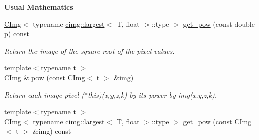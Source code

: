 \begin{Indent}{\bf Usual Mathematics}
\begin{DoxyCompactItemize}
\hyperlink{structcimg__library_1_1_c_img}{CImg}$<$ typename \hyperlink{structcimg__library_1_1cimg_1_1largest}{cimg::largest}$<$ T, float $>$::type $>$ \hyperlink{structcimg__library_1_1_c_img_a1d4a1eb3b00043c5bc66705289346426}{get\_\-pow} (const double p) const 
\begin{DoxyCompactList}\small\item\em Return the image of the square root of the pixel values. \item\end{DoxyCompactList}\item 
{\footnotesize template$<$typename t $>$ }\\\hyperlink{structcimg__library_1_1_c_img}{CImg} \& \hyperlink{structcimg__library_1_1_c_img_adc6088bce27175f0d1ba297a00e73350}{pow} (const \hyperlink{structcimg__library_1_1_c_img}{CImg}$<$ t $>$ \&img)
\begin{DoxyCompactList}\small\item\em Return each image pixel ($\ast$this)(x,y,z,k) by its power by {\ttfamily img(x,y,z,k)}. \item\end{DoxyCompactList}\item 
\hypertarget{structcimg__library_1_1_c_img_a705047141ea672c47de36bfe6c767f55}{
{\footnotesize template$<$typename t $>$ }\\\hyperlink{structcimg__library_1_1_c_img}{CImg}$<$ typename \hyperlink{structcimg__library_1_1cimg_1_1largest}{cimg::largest}$<$ T, float $>$::type $>$ \hyperlink{structcimg__library_1_1_c_img_a705047141ea672c47de36bfe6c767f55}{get\_\-pow} (const \hyperlink{structcimg__library_1_1_c_img}{CImg}$<$ t $>$ \&img) const }
\label{structcimg__library_1_1_c_img_a705047141ea672c47de36bfe6c767f55}


\end{DoxyCompactItemize}
\end{Indent}
